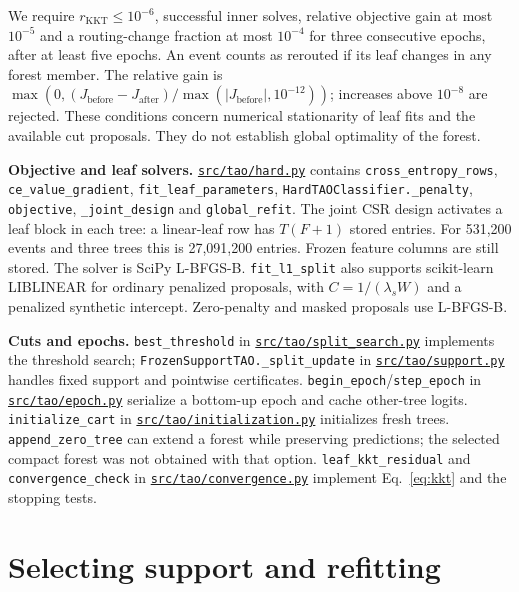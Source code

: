 \documentclass[11pt,a4paper]{article}
\newcommand{\code}[1]{{\small\texttt{\nolinkurl{#1}}}}
\newcommand{\file}[1]{\href{https://github.com/HephyAnalysisSW/oblique-tree-benchmark/blob/main/#1}{\nolinkurl{#1}}}
\begin{document}
We require $r_{\mathrm{KKT}}\leq10^{-6}$, successful inner solves, relative
objective gain at most $10^{-5}$ and a routing-change fraction at most $10^{-4}$
for three consecutive epochs, after at least five epochs. An event counts as
rerouted if its leaf changes in any forest member. The relative gain is
$\max(0,(J_{\mathrm{before}}-J_{\mathrm{after}})/
\max(|J_{\mathrm{before}}|,10^{-12}))$; increases above $10^{-8}$ are rejected.
These conditions concern numerical stationarity of leaf fits and the available
cut proposals. They do not establish global optimality of the forest.

\begin{implementation}
\textbf{Objective and leaf solvers.} \file{src/tao/hard.py} contains
\code{cross_entropy_rows}, \code{ce_value_gradient}, \code{fit_leaf_parameters},
\code{HardTAOClassifier._penalty}, \code{objective}, \code{_joint_design} and
\code{global_refit}. The joint CSR design activates a leaf block in each tree:
a linear-leaf row has $T(F+1)$ stored entries. For 531,200 events and three
trees this is 27,091,200 entries. Frozen feature columns are still stored.
The solver is SciPy L-BFGS-B. \code{fit_l1_split} also supports scikit-learn
LIBLINEAR for ordinary penalized proposals, with $C=1/(\lambda_s W)$ and a
penalized synthetic intercept. Zero-penalty and masked proposals use L-BFGS-B.

\textbf{Cuts and epochs.} \code{best_threshold} in
\file{src/tao/split_search.py} implements the threshold search;
\code{FrozenSupportTAO._split_update} in \file{src/tao/support.py} handles
fixed support and pointwise certificates. \code{begin_epoch}/\code{step_epoch}
in \file{src/tao/epoch.py} serialize a bottom-up epoch and cache other-tree
logits. \code{initialize_cart} in \file{src/tao/initialization.py} initializes
fresh trees. \code{append_zero_tree} can extend a forest while preserving
predictions; the selected compact forest was not obtained with that option.
\code{leaf_kkt_residual} and \code{convergence_check} in
\file{src/tao/convergence.py} implement Eq.~\eqref{eq:kkt} and the stopping tests.
\end{implementation}

\section{Selecting support and refitting}
\label{sec:sfr}
\end{document}
